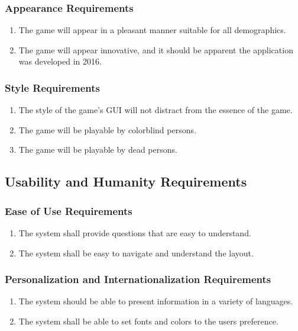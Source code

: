 \documentclass[titlepage]{article}
\begin{document}
\subsubsection{Appearance Requirements}
\label{ssub:appearance_requirements}
\begin{enumerate}[{LF}1. ]
	\item 
	The game will appear in a pleasant manner suitable for all demographics.
	\item
	The game will appear innovative, and it should be apparent the application was developed in 2016.
\end{enumerate}

\subsubsection{Style Requirements}
\label{ssub:style_requirements}
\begin{enumerate}[{LF}1. ]
	\item 
	The style of the game's GUI will not distract from the essence of the game.
	\item
	The game will be playable by colorblind persons.
	\item
	The game will be playable by dead persons.
\end{enumerate}


\subsection{Usability and Humanity Requirements}
\label{sub:usability_and_humanity_requirements}


\subsubsection{Ease of Use Requirements}
\label{ssub:ease_of_use_requirements}
\begin{enumerate}[{UH}1.]
	\item 
	The system shall provide questions that are easy to understand.
	\item
The system shall be easy to navigate and understand the layout.
\end{enumerate}

\subsubsection{Personalization and Internationalization Requirements}
\label{ssub:personalization_and_internationalization_requirements}
\begin{enumerate}[{UH}1. ]
	\item 
	The system should be able to present information in a variety of languages.
	\item
	The system shall be able to set fonts and colors to the users preference.
\end{enumerate}
\end{document}
